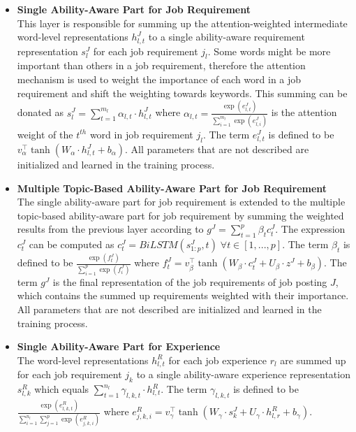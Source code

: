 \documentclass[draft,final]{thesisclass} %
\begin{document}
\begin{itemize}
\begin{itemize}
        \item \textbf{Single Ability-Aware Part for Job Requirement}\\
        This layer is responsible for summing up the attention-weighted intermediate word-level representations $h^J_{l,t}$ to a single ability-aware requirement representation $s^J_l$ for each job requirement $j_l$.
        Some words might be more important than others in a job requirement, therefore the attention mechanism is used to weight the importance of each word in a job requirement and shift the weighting towards keywords.
        This summing can be donated as $s^J_l = \sum_{t=1}^{m_l} \alpha_{l,t} \cdot h^J_{l,t}$ where $\alpha_{l,t} = \frac{\exp(e^J_{l,t})}{\sum_{i=1}^{m_l} \exp(e^J_{l,i})}$ is the attention weight of the $t^{th}$ word in job requirement $j_l$.
        The term $e^J_{l,t}$ is defined to be $v_{\alpha}^{\intercal} \tanh(W_{\alpha} \cdot h^J_{l,t} + b_{\alpha})$.
        All parameters that are not described are initialized and learned in the training process.
        \item \textbf{Multiple Topic-Based Ability-Aware Part for Job Requirement}\\
        The single ability-aware part for job requirement is extended to the multiple topic-based ability-aware part for job requirement by summing the weighted results from the previous layer according to $g^J = \sum_{t=1}^p \beta_t c_t^J$.
        The expression $c_t^J$ can be computed as $c_t^J = BiLSTM(s^J_{1:p},t) \; \forall t \in [1,...,p]$.
        The term $\beta_t$ is defined to be $\frac{\exp(f^J_t)}{\sum_{i=1}^p \exp(f^J_i)}$ where $f^J_t = v_{\beta}^{\intercal} \tanh(W_{\beta} \cdot c_t^J + U_\beta \cdot z^J + b_{\beta})$.
        The term $g^J$ is the final representation of the job requirements of job posting $J$, which contains the summed up requirements weighted with their importance.
        All parameters that are not described are initialized and learned in the training process.
        \item \textbf{Single Ability-Aware Part for Experience}\\
        The word-level representations $h^R_{l,t}$ for each job experience $r_l$ are summed up for each job requirement $j_k$ to a single ability-aware experience representation $s^R_{l,k}$ which equals $\sum_{t=1}^{n_l} \gamma_{l,k,t} \cdot h^R_{l,t}$.
        The term $\gamma_{l,k,t}$ is defined to be $\frac{\exp(e^R_{l,k,t})}{\sum_{i=1}^{n_l} \sum^p_{j=1} \exp(e^R_{j,k,i})}$ where $e^R_{j,k,i} = v_{\gamma}^{\intercal} \tanh(W_{\gamma} \cdot s^J_{k} + U_\gamma \cdot h^R_{l,r} + b_{\gamma})$.

\end{itemize}
\end{itemize}
\end{document}
